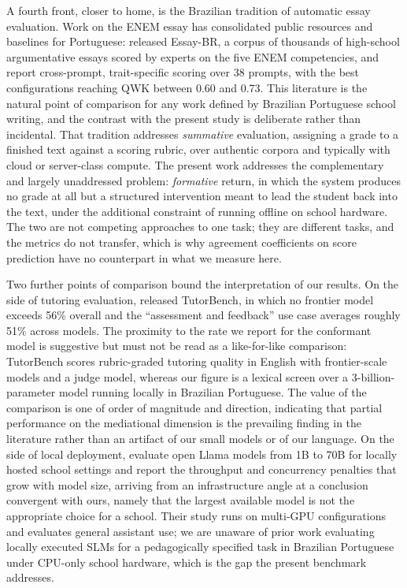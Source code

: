 \documentclass{sbc2023}%
\begin{document}
A fourth front, closer to home, is the Brazilian tradition of automatic essay evaluation. Work on the ENEM essay has consolidated public resources and baselines for Portuguese: \citet{marinho2022essaybr} released Essay-BR, a corpus of thousands of high-school argumentative essays scored by experts on the five ENEM competencies, and \citet{barbosa2026aesenem} report cross-prompt, trait-specific scoring over 38 prompts, with the best configurations reaching QWK between 0.60 and 0.73. This literature is the natural point of comparison for any work defined by Brazilian Portuguese school writing, and the contrast with the present study is deliberate rather than incidental. That tradition addresses \textit{summative} evaluation, assigning a grade to a finished text against a scoring rubric, over authentic corpora and typically with cloud or server-class compute. The present work addresses the complementary and largely unaddressed problem: \textit{formative} return, in which the system produces no grade at all but a structured intervention meant to lead the student back into the text, under the additional constraint of running offline on school hardware. The two are not competing approaches to one task; they are different tasks, and the metrics do not transfer, which is why agreement coefficients on score prediction have no counterpart in what we measure here.

Two further points of comparison bound the interpretation of our results. On the side of tutoring evaluation, \citet{srinivasa2025tutorbench} released TutorBench, in which no frontier model exceeds 56\% overall and the ``assessment and feedback'' use case averages roughly 51\% across models. The proximity to the rate we report for the conformant model is suggestive but must not be read as a like-for-like comparison: TutorBench scores rubric-graded tutoring quality in English with frontier-scale models and a judge model, whereas our figure is a lexical screen over a 3-billion-parameter model running locally in Brazilian Portuguese. The value of the comparison is one of order of magnitude and direction, indicating that partial performance on the mediational dimension is the prevailing finding in the literature rather than an artifact of our small models or of our language. On the side of local deployment, \citet{chan2026bigger} evaluate open Llama models from 1B to 70B for locally hosted school settings and report the throughput and concurrency penalties that grow with model size, arriving from an infrastructure angle at a conclusion convergent with ours, namely that the largest available model is not the appropriate choice for a school. Their study runs on multi-GPU configurations and evaluates general assistant use; we are unaware of prior work evaluating locally executed SLMs for a pedagogically specified task in Brazilian Portuguese under CPU-only school hardware, which is the gap the present benchmark addresses.
\end{document}
